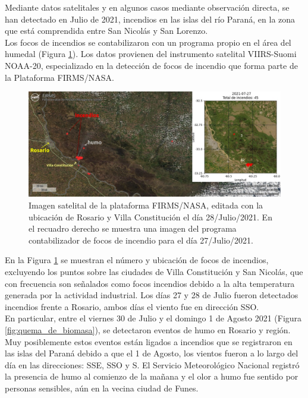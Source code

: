 Mediante datos satelitales y en algunos casos mediante observación directa, se han detectado en Julio de 2021,  incendios en las islas del río Paraná, en la zona que está comprendida entre San Nicolás y San Lorenzo.\\

Los focos de incendios se contabilizaron con un programa propio en el área del humedal (Figura \ref{fig:satelital}). Los datos provienen del instrumento satelital VIIRS-Suomi NOAA-20, especializado en la detección de focos de incendio que forma parte de la Plataforma FIRMS/NASA.

\begin{figure}[H]
    \centering
    \includegraphics[width=0.75\paperwidth]{images/image3.jpg}
    \caption{Imagen satelital de la plataforma FIRMS/NASA, editada con la ubicación de Rosario y Villa Constitución el día 28/Julio/2021. En el recuadro derecho se muestra una imagen del programa contabilizador de focos de incendio para el día 27/Julio/2021.}
    \label{fig:satelital}
\end{figure}


En la Figura \ref{fig:satelital} se muestran el número y ubicación de focos de incendios, excluyendo los puntos sobre las ciudades de Villa Constitución y San Nicolás, que con frecuencia son señalados como focos incendios debido a la alta temperatura generada por la actividad industrial. Los días 27 y 28 de Julio fueron detectados incendios frente a Rosario, ambos días el viento fue en dirección SSO.\\

En particular, entre el viernes 30 de Julio y el domingo 1 de Agosto 2021 (Figura \ref{fig:quema_de_biomasa}), se detectaron eventos de humo en Rosario y región. Muy posiblemente estos eventos están ligados a incendios que se registraron en las islas del Paraná debido a que el 1 de Agosto, los vientos fueron a lo largo del día en las direcciones: SSE, SSO y S. El Servicio Meteorológico Nacional registró la presencia de humo al comienzo de la mañana y el olor a humo fue sentido por personas sensibles, aún en la vecina ciudad de Funes.\\

